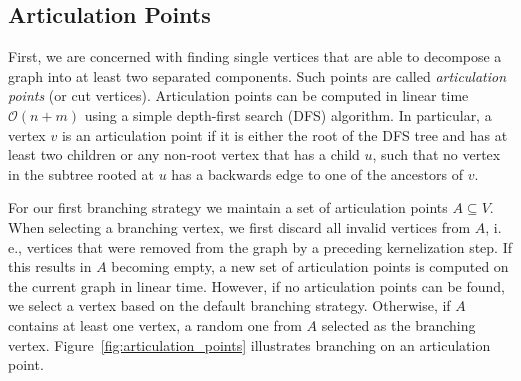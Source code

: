 \documentclass[a4paper,UKenglish,cleveref, autoref, thm-restate]{lipics-v2021}
\newcommand{\ie}{i.\,e.,\xspace}
\begin{document}
\subsection{Articulation Points}
First, we are concerned with finding single vertices that are able to decompose a graph into at least two separated components.
Such points are called \emph{articulation points} (or cut vertices).
Articulation points can be computed in linear time $\mathcal{O}(n+m)$ using a simple depth-first search (DFS) algorithm.
In particular, a vertex $v$ is an articulation point if it is either the root of
the DFS tree and has at least two children or any non-root vertex that has a child $u$, such that no vertex in
the subtree rooted at $u$ has a backwards edge to one of the ancestors of
$v$.

For our first branching strategy we maintain a set of articulation points $A \subseteq V$.
When selecting a branching vertex, we first discard all invalid vertices from $A$, \ie vertices that were removed from the graph by a preceding kernelization step.
If this results in $A$ becoming empty, a new set of articulation points is computed on the current graph in linear time.
However, if no articulation points can be found, we select a vertex based on the default branching strategy.
Otherwise, if $A$ contains at least one vertex, a random one from $A$ selected as the branching
vertex. Figure~\ref{fig:articulation_points} illustrates branching on an
articulation point.
\end{document}
